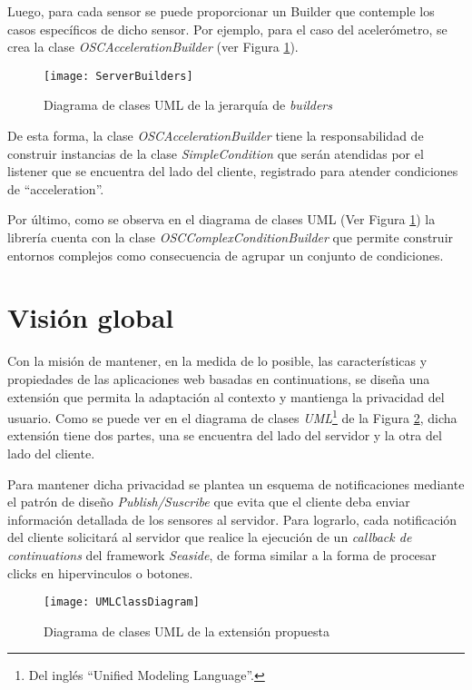 Luego, para cada sensor se puede proporcionar un Builder que contemple los casos específicos de dicho sensor. Por ejemplo, para el caso del acelerómetro, se crea la clase \emph{OSCAccelerationBuilder} (ver Figura \ref{ServerBuilders}).

\begin{figure}[ht!]
\centering
\texttt{[image: ServerBuilders]}
\caption{Diagrama de clases UML de la jerarquía de \emph{builders}}
\label{ServerBuilders}
\end{figure}

De esta forma, la clase \emph{OSCAccelerationBuilder} tiene la responsabilidad de construir instancias de la clase \emph{SimpleCondition} que serán atendidas por el listener que se encuentra del lado del cliente, registrado para atender condiciones de ``acceleration''.

Por último, como se observa en el diagrama de clases UML (Ver Figura \ref{ServerBuilders}) la librería cuenta con la clase \emph{OSCComplexConditionBuilder} que permite construir entornos complejos como consecuencia de agrupar un conjunto de condiciones.


\section{Visión global}

Con la misión de mantener, en la medida de lo posible, las características y propiedades de las aplicaciones web basadas en continuations, se diseña una extensión que permita la adaptación al contexto y mantienga la privacidad del usuario. Como se puede ver en el diagrama de clases \emph{UML}\footnote{Del inglés ``Unified Modeling Language''.} de la Figura \ref{UMLClassDiagram}, dicha extensión tiene dos partes, una se encuentra del lado del servidor y la otra del lado del cliente.

Para mantener dicha privacidad se plantea un esquema de notificaciones mediante el patrón de diseño \emph{Publish/Suscribe} que evita que el cliente deba enviar información detallada de los sensores al servidor. Para lograrlo, cada notificación del cliente solicitará al servidor que realice la ejecución de un \emph{callback de continuations} del framework \emph{Seaside}, de forma similar a la forma de procesar clicks en hipervinculos o botones.

\begin{figure}[ht!]
\centering
\texttt{[image: UMLClassDiagram]}
\caption{Diagrama de clases UML de la extensión propuesta}
\label{UMLClassDiagram}
\end{figure}